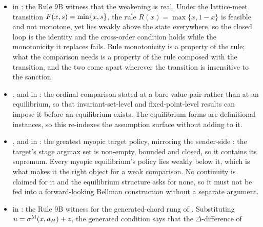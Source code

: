 \begin{itemize}[leftmargin=1.4em,itemsep=1pt]
copy of an economy, the same economy with its transition replaced by the affine
law at its own rate $\delta$. The affine rule-path lemmas
,
 and
 are one-line instances at that copy
(, ); no statement
changed and no transition hypothesis was added.
\item {} in
: the Rule 9B
witness that the weakening is real.  Under the lattice-meet transition
$F(x,s)=\min\{x,s\}$, the rule $R(x)=\max\{x,1-x\}$ is feasible and not
monotone, yet lies weakly above the state everywhere, so the closed loop is the
identity and the cross-order condition holds while the monotonicity it replaces
fails.  Rule monotonicity is a property of the rule; what the comparison needs is
a property of the rule composed with the transition, and the two come apart
wherever the transition is insensitive to the sanction.
\item {},
 and
 in
: the ordinal
comparison stated at a bare value pair rather than at an equilibrium, so that
invariant-set-level and fixed-point-level results can impose it before an equilibrium
exists.  The equilibrium forms are definitional instances, so this re-indexes the
assumption surface without adding to it.
\item {},
 and
 in
: the greatest
myopic target policy, mirroring the sender-side : the target's
stage argmax set is non-empty, bounded and closed, so it contains its supremum.
Every myopic equilibrium's policy lies weakly below it, which is what makes it the
right object for a weak comparison.  No continuity is claimed for it and the
equilibrium structure asks for none, so it must not be fed into a forward-looking
Bellman construction without a separate argument.
\item {} in
: the Rule 9B
witness for the generated-chord rung of .  Substituting
$u=\sigma^{\mathrm{M}}(x,a_H)+z$, the generated condition says that the $\Delta$-difference of

\end{itemize}
